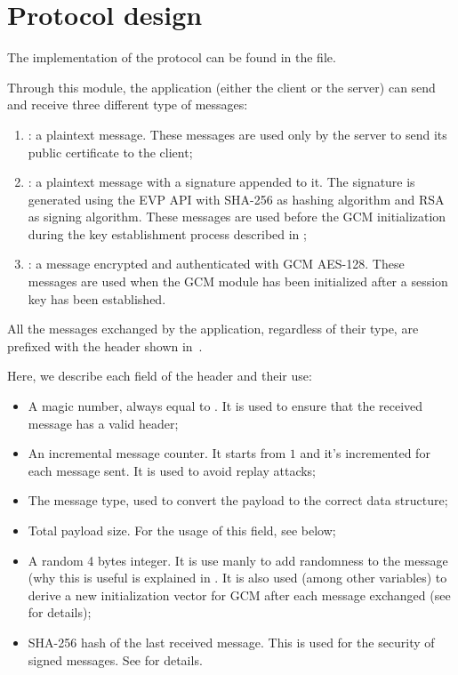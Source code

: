 \chapter{Protocol design}\label{ch:proto}

The implementation of the protocol can be found in the 
file.

Through this module, the application (either the client or the server) can send
and receive three different type of messages:
\begin{enumerate}
	\item {}: a plaintext message. These messages are
		used only by the server to send its public certificate to the
		client;
	\item {}: a plaintext message with a signature
		appended to it. The signature is generated using the \openssl{}
		EVP API with SHA-256 as hashing algorithm and RSA as signing
		algorithm. These messages are used before the GCM initialization
		during the key establishment process described in
		;
	\item {}: a message encrypted and
		authenticated with GCM AES-128. These messages are used when the
		GCM module has been initialized after a session key has been
		established.
\end{enumerate}

All the messages exchanged by the application, regardless of their type, are
prefixed with the header shown in~.



Here, we describe each field of the header and their use:
\begin{itemize}
	\item[\standout{magic}] A magic number, always equal to .
		It is used to ensure that the received message has a valid
		header;
	\item[\standout{counter}] An incremental message counter. It starts from
		\(1\) and it's incremented for each message sent. It is used to
		avoid replay attacks;
	\item[\standout{type}] The message type, used to convert the payload to
		the correct data structure;
	\item[\standout{payload\_size}] Total payload size. For the usage of
		this field, see below;
	\item[\standout{nonce}] A random 4 bytes integer. It is use manly to add
		randomness to the message (why this is useful is explained in
		. It is also used (among other variables) to derive a new
		initialization vector for GCM after each message exchanged (see
		 for details);
	\item[\standout{prev\_hash}] SHA-256 hash of the last received message.
		This is used for the security of signed messages. See
		 for details.
\end{itemize}

